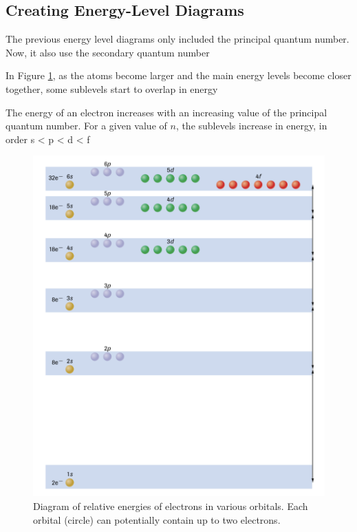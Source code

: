 \subsection{Creating Energy-Level Diagrams}
\begin{bulleted-list}
    \item The previous energy level diagrams only included the principal quantum number. Now,
        it also use the secondary quantum number
    \item In Figure \ref{fig:energy-level-diagram}, as the atoms become larger and the main
        energy levels become closer together, some sublevels start to overlap in energy
    \item The energy of an electron increases with an increasing value of the principal quantum
        number. For a given value of $n$, the sublevels increase in energy, in order s < p < d < f
\end{bulleted-list}

\begin{figure}[ht!]
    \centering
    \includegraphics[width=0.7 \textwidth]{../figures/energy-level-diagram.png}
    \caption{Diagram of relative energies of electrons in various orbitals. Each orbital (circle)
            can potentially contain up to two electrons.}
    \label{fig:energy-level-diagram}
\end{figure}

